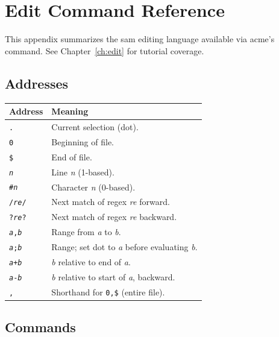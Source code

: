 \chapter{Edit Command Reference}
\label{app:editref}


This appendix summarizes the sam editing language available via acme's
 command.  See Chapter~\ref{ch:edit} for tutorial coverage.

\section{Addresses}

\begin{longtable}{@{}lp{3.5in}@{}}
\toprule
Address & Meaning \\
\midrule
\endhead
\texttt{.} & Current selection (dot). \\
\texttt{0} & Beginning of file. \\
\texttt{\$} & End of file. \\
\texttt{\textit{n}} & Line \textit{n} (1-based). \\
\texttt{\#\textit{n}} & Character \textit{n} (0-based). \\
\texttt{/\textit{re}/} & Next match of regex \textit{re} forward. \\
\texttt{?\textit{re}?} & Next match of regex \textit{re} backward. \\
\texttt{\textit{a},\textit{b}} & Range from \textit{a} to \textit{b}. \\
\texttt{\textit{a};\textit{b}} & Range; set dot to \textit{a} before evaluating
  \textit{b}. \\
\texttt{\textit{a}+\textit{b}} & \textit{b} relative to end of \textit{a}. \\
\texttt{\textit{a}-\textit{b}} & \textit{b} relative to start of \textit{a},
  backward. \\
\texttt{,} & Shorthand for \texttt{0,\$} (entire file). \\
\bottomrule
\end{longtable}

\section{Commands}

